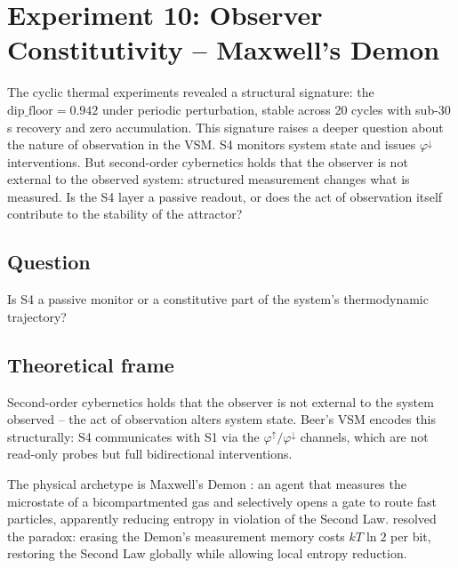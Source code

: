 \documentclass[11pt, a4paper]{article}
\begin{document}
\FloatBarrier
\section{Experiment 10: Observer Constitutivity -- Maxwell's Demon}
\label{sec:maxwell}

The cyclic thermal experiments revealed a structural signature: the
$\text{dip\_floor} = 0.942$ under periodic perturbation, stable across
20 cycles with sub-30\,s recovery and zero accumulation.
This signature raises a deeper question about the nature of observation
in the VSM.
S4 monitors system state and issues $\varphi^\downarrow$ interventions.
But second-order cybernetics \citep{vonfoerster1979cybernetics} holds that the observer
is not external to the observed system: structured measurement changes what
is measured.
Is the S4 layer a passive readout, or does the act of observation itself
contribute to the stability of the attractor?

\subsection*{Question}
Is S4 a passive monitor or a constitutive part of the system's thermodynamic
trajectory?

\subsection{Theoretical frame}

Second-order cybernetics \citep{vonfoerster1979cybernetics} holds that the observer is not
external to the system observed -- the act of observation alters system state.
Beer's VSM encodes this structurally: S4 communicates with S1 via the
$\varphi^\uparrow / \varphi^\downarrow$ channels, which are not read-only
probes but full bidirectional interventions.

The physical archetype is Maxwell's Demon \citep{maxwell1871theory}: an agent that
measures the microstate of a bicompartmented gas and selectively opens a gate
to route fast particles, apparently reducing entropy in violation of the Second
Law.  \citet{landauer1961irreversibility} resolved the paradox: erasing the Demon's measurement
memory costs $kT \ln 2$ per bit, restoring the Second Law globally while
allowing local entropy reduction.
\end{document}
